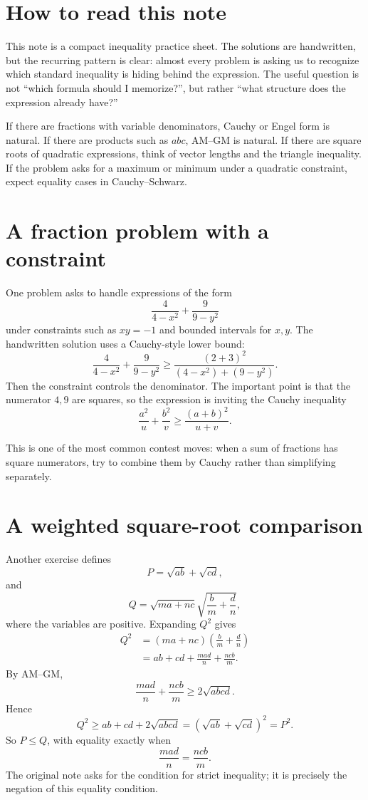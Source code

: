 
\section{How to read this note}

This note is a compact inequality practice sheet.  The solutions are handwritten, but the recurring pattern is clear: almost every problem is asking us to recognize which standard inequality is hiding behind the expression.  The useful question is not ``which formula should I memorize?'', but rather ``what structure does the expression already have?''

If there are fractions with variable denominators, Cauchy or Engel form is natural.  If there are products such as \(abc\), AM--GM is natural.  If there are square roots of quadratic expressions, think of vector lengths and the triangle inequality.  If the problem asks for a maximum or minimum under a quadratic constraint, expect equality cases in Cauchy--Schwarz.

\section{A fraction problem with a constraint}

One problem asks to handle expressions of the form
\[
  \frac{4}{4-x^2}+\frac{9}{9-y^2}
\]
under constraints such as \(xy=-1\) and bounded intervals for \(x,y\).  The handwritten solution uses a Cauchy-style lower bound:
\[
  \frac{4}{4-x^2}+\frac{9}{9-y^2}
  \ge
  \frac{(2+3)^2}{(4-x^2)+(9-y^2)}.
\]
Then the constraint controls the denominator.  The important point is that the numerator \(4,9\) are squares, so the expression is inviting the Cauchy inequality
\[
  \frac{a^2}{u}+\frac{b^2}{v}\ge \frac{(a+b)^2}{u+v}.
\]

This is one of the most common contest moves: when a sum of fractions has square numerators, try to combine them by Cauchy rather than simplifying separately.

\section{A weighted square-root comparison}

Another exercise defines
\[
  P=\sqrt{ab}+\sqrt{cd},
\]
and
\[
  Q=\sqrt{ma+nc}\sqrt{\frac bm+\frac dn},
\]
where the variables are positive.  Expanding \(Q^2\) gives
\[
\begin{aligned}
Q^2
&=(ma+nc)\left(\frac bm+\frac dn\right)\\
&=ab+cd+\frac{mad}{n}+\frac{ncb}{m}.
\end{aligned}
\]
By AM--GM,
\[
  \frac{mad}{n}+\frac{ncb}{m}\ge 2\sqrt{abcd}.
\]
Hence
\[
  Q^2\ge ab+cd+2\sqrt{abcd}=(\sqrt{ab}+\sqrt{cd})^2=P^2.
\]
So \(P\le Q\), with equality exactly when
\[
  \frac{mad}{n}=\frac{ncb}{m}.
\]
The original note asks for the condition for strict inequality; it is precisely the negation of this equality condition.

